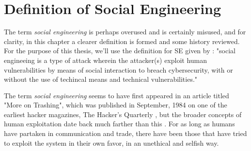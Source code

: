 

    

\chapter{Definition of Social Engineering\label{definition}}
\begin{comment}

Guides:
    - Page limit 1-2 pages

TODO:
    [ ] Who is this thesis for
    [ ] Why should you read my thesis
    [ ] What is the research question and how it is answered
    [ ] How is this thesis organized, what is covered and what is deliberaly not covered and in what chapters (outline)

What to cover:
    - What is cybersecurity and why it's of paramount importance
    - What is social engineering
        - Brief history of social engineering
            - Phishing in 1996 via AOL
    - Attacks, classical social engineering attacks
        - Phishing, vishing, smishing
        - Tailgating
        - Baiting (not always considered SE)
        - Dumpster diving (not always considered SE)
    - Countermeasures, classical
        - User awareness & training programs
        - Company policy & company culture
        - Real-time threat detection
        - Vulnerability detection
    - Typical challenges
    - Motives for cybercrimes
        - Hard(er) to detect?
        - "Easy" wins?

Literature:
    - Defining Social Engineering in Cybersecurity

\end{comment}

The term \textit{social engineering} is perhaps overused and is certainly misused, and for clarity, in this chapter a clearer definition is formed and some history reviewed. For the purpose of this thesis, we'll use the definition for SE given by \cite{wang_defining_2020}: "social engineeing is a type of attack wherein the attacker(s) exploit human vulnerabilities by means of social interaction to breach cybersecurity, with or without the use of techincal means and technical vulnerabilities."

The term \textit{social engineering} seems to have first appeared in an article titled "More on Trashing", which was published in September, 1984 on one of the earliest hacker magazines, The Hacker's Quarterly \citep{wang_defining_2020}, but the broader concepts of human exploitation date back much farther than this \citep{qin_investigation_2007}. For as long as humans have partaken in communication and trade, there have been those that have tried to exploit the system in their own favor, in an unethical and selfish way.

